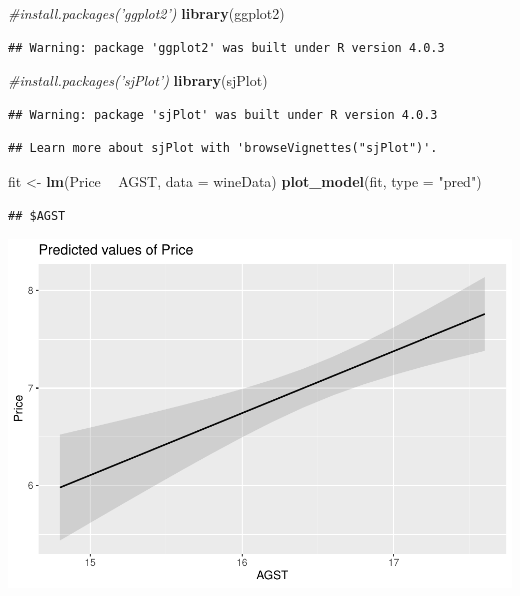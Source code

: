 \documentclass[
]{article}
\newenvironment{Shaded}{\begin{snugshade}}{\end{snugshade}}
\newcommand{\CommentTok}[1]{\textcolor[rgb]{0.56,0.35,0.01}{\textit{#1}}}
\newcommand{\DataTypeTok}[1]{\textcolor[rgb]{0.13,0.29,0.53}{#1}}
\newcommand{\KeywordTok}[1]{\textcolor[rgb]{0.13,0.29,0.53}{\textbf{#1}}}
\newcommand{\NormalTok}[1]{#1}
\newcommand{\OperatorTok}[1]{\textcolor[rgb]{0.81,0.36,0.00}{\textbf{#1}}}
\newcommand{\StringTok}[1]{\textcolor[rgb]{0.31,0.60,0.02}{#1}}
\begin{document}
\begin{Shaded}
\begin{Highlighting}[]
\CommentTok{#install.packages('ggplot2')}
\KeywordTok{library}\NormalTok{(ggplot2)}
\end{Highlighting}
\end{Shaded}

\begin{verbatim}
## Warning: package 'ggplot2' was built under R version 4.0.3
\end{verbatim}

\begin{Shaded}
\begin{Highlighting}[]
\CommentTok{#install.packages('sjPlot')}
\KeywordTok{library}\NormalTok{(sjPlot)}
\end{Highlighting}
\end{Shaded}

\begin{verbatim}
## Warning: package 'sjPlot' was built under R version 4.0.3
\end{verbatim}

\begin{verbatim}
## Learn more about sjPlot with 'browseVignettes("sjPlot")'.
\end{verbatim}

\begin{Shaded}
\begin{Highlighting}[]
\NormalTok{fit <-}\StringTok{ }\KeywordTok{lm}\NormalTok{(Price }\OperatorTok{~}\StringTok{ }\NormalTok{AGST, }\DataTypeTok{data =}\NormalTok{ wineData)}
\KeywordTok{plot_model}\NormalTok{(fit, }\DataTypeTok{type =} \StringTok{"pred"}\NormalTok{)}
\end{Highlighting}
\end{Shaded}

\begin{verbatim}
## $AGST
\end{verbatim}

\includegraphics{HW2_Liu-Zi-Jian_files/figure-latex/unnamed-chunk-24-1.pdf}
\end{document}
